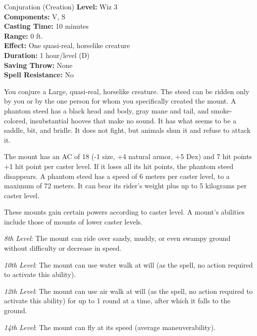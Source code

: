 {Conjuration (Creation)}
{
	\textbf{Level:}
	Wiz 3\\
	\textbf{Components:}
	V, S\\
	\textbf{Casting Time:}
	10 minutes\\
	\textbf{Range:}
	0 ft.\\
	\textbf{Effect:}
	One quasi-real, horselike creature\\
	\textbf{Duration:}
	1 hour/level (D)\\
	\textbf{Saving Throw:}
	None\\
	\textbf{Spell Resistance:}
	No\\
}
{
	You conjure a Large, quasi-real, horselike creature. The steed can be ridden only by you or by the one person for whom you specifically created the mount. A phantom steed has a black head and body, gray mane and tail, and smoke-colored, insubstantial hooves that make no sound. It has what seems to be a saddle, bit, and bridle. It does not fight, but animals shun it and refuse to attack it.

	The mount has an AC of 18 (-1 size, +4 natural armor, +5 Dex) and 7 hit points +1 hit point per caster level. If it loses all its hit points, the phantom steed disappears. A phantom steed has a speed of 6 meters per caster level, to a maximum of 72 meters. It can bear its rider's weight plus up to 5 kilograms per caster level.

	These mounts gain certain powers according to caster level. A mount's abilities include those of mounts of lower caster levels.

	\textit{8th Level}:
	The mount can ride over sandy, muddy, or even swampy ground without difficulty or decrease in speed.

	\textit{10th Level}:
	The mount can use water walk at will (as the spell, no action required to activate this ability).

	\textit{12th Level}:
	The mount can use air walk at will (as the spell, no action required to activate this ability) for up to 1 round at a time, after which it falls to the ground.

	\textit{14th Level}:
	The mount can fly at its speed (average maneuverability).

}
